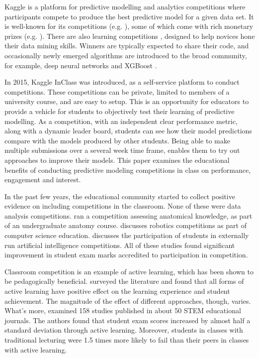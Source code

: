 \documentclass[12pt]{article}
\begin{document}
Kaggle \citep{kaggle} is a platform for predictive modelling and
analytics competitions where participants compete to produce the best
predictive model for a given data set. It is well-known for its
competitions (e.g. \citet{darkmatter}), some of which come with rich
monetary prizes (e.g. \citet{heritage}). There are also learning
competitions \citep{kagglelearn}, designed to help novices hone their
data mining skills. Winners are typically expected to share their code,
and occasionally newly emerged algorithms are introduced to the broad
community, for example, deep neural networks \citep{HintonDahi12} and
XGBoost \citep{ChenXGBoost}.

In 2015, Kaggle InClass was introduced, as a self-service platform to
conduct competitions. These competitions can be private, limited to
members of a university course, and are easy to setup. This is an
opportunity for educators to provide a vehicle for students to
objectively test their learning of predictive modelling. As a
competition, with an independent clear performance metric, along with a
dynamic leader board, students can see how their model predictions
compare with the models produced by other students. Being able to make
multiple submissions over a several week time frame, enables them to try
out approaches to improve their models. This paper examines the
educational benefits of conducting predictive modeling competitions in
class on performance, engagement and interest.

In the past few years, the educational community started to collect
positive evidence on including competitions in the classroom. None of
these were data analysis competitions. \citet{VanNuland15} ran a
competition assessing anatomical knowledge, as part of an undergraduate
anatomy course. \citet{Calnon12} discusses robotics competitions as part
of computer science education. \citet{Canada15} discusses the
participation of students in externally run artificial intelligence
competitions. All of these studies found significant improvement in
student exam marks accredited to participation in competition.

Classroom competition is an example of active learning, which has been
shown to be pedagogically beneficial. \citet{Prince04} surveyed the
literature and found that all forms of active learning have positive
effect on the learning experience and student achievement. The magnitude
of the effect of different approaches, though, varies. What's more,
\citet{Freeman14} examined 158 studies published in about 50 STEM
educational journals. The authors found that student exam scores
increased by almost half a standard deviation through active learning.
Moreover, students in classes with traditional lecturing were 1.5 times
more likely to fail than their peers in classes with active learning.
\end{document}
